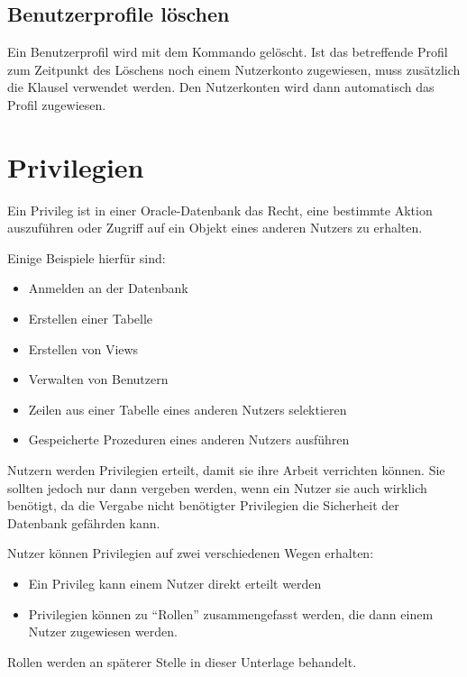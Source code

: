       \subsection{Benutzerprofile l\"oschen}
        Ein Benutzerprofil wird mit dem Kommando  gel\"oscht. Ist das betreffende Profil zum Zeitpunkt des L\"oschens noch einem Nutzerkonto zugewiesen, muss zus\"atzlich die Klausel  verwendet werden. Den Nutzerkonten wird dann automatisch das Profil  zugewiesen.
        \begin{literaturinternet}
          \item \cite{i1006575}
        \end{literaturinternet}
    \section{Privilegien}
      \begin{merke}
        Ein Privileg ist in einer Oracle-Datenbank das Recht, eine bestimmte
        Aktion auszuf\"uhren oder Zugriff auf ein Objekt eines anderen
        Nutzers zu erhalten.
      \end{merke}
      Einige Beispiele hierf\"ur sind:
      \begin{itemize}
        \item Anmelden an der Datenbank
        \item Erstellen einer Tabelle
        \item Erstellen von Views
        \item Verwalten von Benutzern
        \item Zeilen aus einer Tabelle eines anderen Nutzers selektieren
        \item Gespeicherte Prozeduren eines anderen Nutzers ausf\"uhren
      \end{itemize}
      Nutzern werden  Privilegien erteilt, damit sie ihre Arbeit verrichten
      k\"onnen. Sie sollten jedoch nur dann vergeben werden, wenn ein Nutzer sie
      auch wirklich ben\"otigt, da die Vergabe nicht ben\"otigter Privilegien
      die Sicherheit der Datenbank gef\"ahrden kann.
      
      Nutzer k\"onnen Privilegien auf zwei verschiedenen Wegen erhalten:
      \begin{itemize}
        \item Ein Privileg kann einem Nutzer direkt erteilt werden
        \item Privilegien k\"onnen zu \enquote{Rollen} zusammengefasst werden, die dann einem Nutzer zugewiesen werden.
      \end{itemize}
      Rollen werden an sp\"aterer Stelle in dieser Unterlage behandelt.
